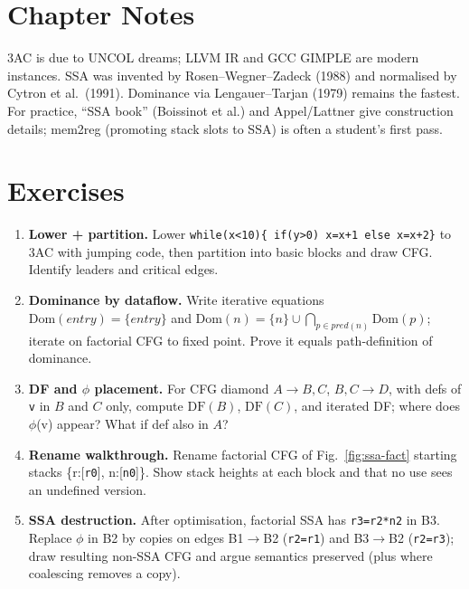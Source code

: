 \section{Chapter Notes}
3AC is due to UNCOL dreams; LLVM IR and GCC GIMPLE are modern instances. SSA was invented by Rosen--Wegner--Zadeck (1988) and normalised by Cytron et al.\ (1991). Dominance via Lengauer--Tarjan (1979) remains the fastest. For practice, ``SSA book'' (Boissinot et al.) and Appel/Lattner give construction details; mem2reg (promoting stack slots to SSA) is often a student's first pass.

\section{Exercises}
\label{sec:ch05-exercises}
\begin{enumerate}[label=E5.\arabic*, leftmargin=*, itemsep=0.8em]
\item \textbf{Lower + partition.} Lower \texttt{while(x<10)\{ if(y>0) x=x+1 else x=x+2\}} to 3AC with jumping code, then partition into basic blocks and draw CFG. Identify leaders and critical edges.
\item \textbf{Dominance by dataflow.} Write iterative equations
$\text{Dom}(entry)=\{entry\}$ and
$\text{Dom}(n)=\{n\}\cup\bigcap_{p\in pred(n)}\text{Dom}(p)$;
iterate on factorial CFG to fixed point. Prove it equals path-definition of dominance.
\item \textbf{DF and $\phi$ placement.} For CFG diamond $A\to B,C$, $B,C\to D$, with defs of \texttt{v} in $B$ and $C$ only, compute $\text{DF}(B)$, $\text{DF}(C)$, and iterated DF; where does $\phi$(v) appear? What if def also in $A$?
\item \textbf{Rename walkthrough.} Rename factorial CFG of Fig.~\ref{fig:ssa-fact} starting stacks \{r:[\texttt{r0}], n:[\texttt{n0}]\}. Show stack heights at each block and that no use sees an undefined version.
\item \textbf{SSA destruction.} After optimisation, factorial SSA has \texttt{r3=r2*n2} in B3. Replace $\phi$ in B2 by copies on edges B1$\to$B2 (\texttt{r2=r1}) and B3$\to$B2 (\texttt{r2=r3}); draw resulting non-SSA CFG and argue semantics preserved (plus where coalescing removes a copy).
\end{enumerate}

